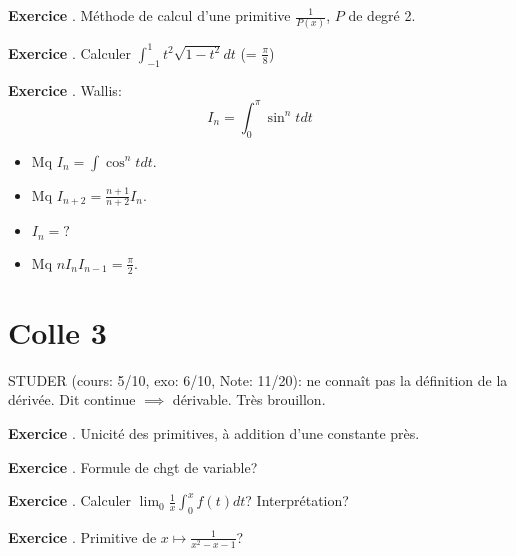 \documentclass[10pt,a4paper]{article}
\newcounter{question}
\newcounter{exo}
\newenvironment{exo}{\vspace{0.5cm}\setcounter{question}{0}\addtocounter{exo}{1} \noindent \textbf{Exercice \theexo}. \normalsize }{\par}
\begin{document}
	\begin{exo}
		Méthode de calcul d'une primitive $\frac{1}{P(x)}$, $P$ de degré 2.
	\end{exo}
	
	\begin{exo}
		Calculer $\int_{-1}^{1} t^2 \sqrt{1 - t^2} dt$ (= $\frac{\pi}{8}$)
	\end{exo}
			
	\begin{exo}
		Wallis:
		$$I_n = \int_{0}^{\pi} \sin^n t dt$$
		\begin{itemize}
			\item Mq $I_n = \int \cos^n t dt$.
			\item Mq $I_{n+2} = \frac{n+1}{n+2} I_n$.
			\item $I_n = ?$
			\item Mq $n I_n I_{n-1} = \frac{\pi}{2}$.
		\end{itemize}
	\end{exo}
			
	\section*{Colle 3}
	\setcounter{exo}{0}
	STUDER (cours: 5/10, exo: 6/10, Note: 11/20): ne connaît pas la définition de la dérivée. Dit continue $\implies$ dérivable. Très brouillon.\\
	
	\begin{exo}
		Unicité des primitives, à addition d'une constante près.
	\end{exo}

	\begin{exo}
		Formule de chgt de variable?
	\end{exo}
	
	\begin{exo}
		Calculer $\lim_0 \frac{1}{x} \int_{0}^{x} f(t)dt$? Interprétation? 
	\end{exo}
	
	\begin{exo}
		Primitive de $x \longmapsto \frac{1}{x^2 - x - 1}$?
	\end{exo}
\end{document}
